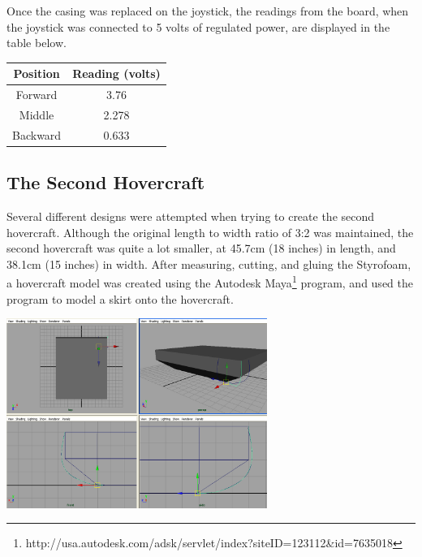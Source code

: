 Once the casing was replaced on the joystick, the readings from the board, when the joystick was connected to 5 volts of regulated power, are displayed in the table below.

\begin{minipage}{6.5in}
\begin{center}
\begin{tabular}{ c c }
  Position & Reading (volts) \\
  \hline
  Forward & 3.76 \\
  Middle & 2.278 \\
  Backward & 0.633 \\
\end{tabular}
\end{center}
\label{voltagePotentiometerTable}
\end{minipage}

\subsection{The Second Hovercraft}
Several different designs were attempted when trying to create the second hovercraft. Although the original length to width ratio
of 3:2 was maintained, the second hovercraft was quite a lot smaller, at 45.7cm (18 inches) in length, and 38.1cm (15 inches) in width.
After measuring, cutting, and gluing the Styrofoam, a hovercraft model was created using the Autodesk Maya\footnote{ http://usa.autodesk.com/adsk/servlet/index?siteID=123112\&id=7635018 }
program, and used the program to model a skirt onto the hovercraft.

\begin{minipage}{6.5in}
\begin{center}
  \includegraphics[width=85mm]{imageSources/maya.png}
\end{center}
\label{maya}
\end{minipage}

